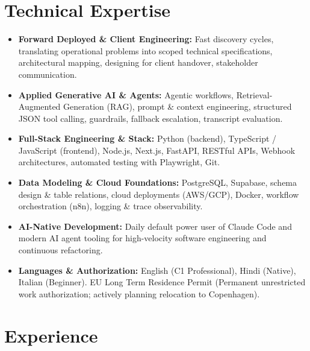 \documentclass[10pt,a4paper]{article}
\begin{document}
\section{Technical Expertise}
\begin{itemize}
  \item \textbf{Forward Deployed \& Client Engineering:} Fast discovery cycles, translating operational problems into scoped technical specifications, architectural mapping, designing for client handover, stakeholder communication.
  \item \textbf{Applied Generative AI \& Agents:} Agentic workflows, Retrieval-Augmented Generation (RAG), prompt \& context engineering, structured JSON tool calling, guardrails, fallback escalation, transcript evaluation.
  \item \textbf{Full-Stack Engineering \& Stack:} Python (backend), TypeScript / JavaScript (frontend), Node.js, Next.js, FastAPI, RESTful APIs, Webhook architectures, automated testing with Playwright, Git.
  \item \textbf{Data Modeling \& Cloud Foundations:} PostgreSQL, Supabase, schema design \& table relations, cloud deployments (AWS/GCP), Docker, workflow orchestration (n8n), logging \& trace observability.
  \item \textbf{AI-Native Development:} Daily default power user of Claude Code and modern AI agent tooling for high-velocity software engineering and continuous refactoring.
  \item \textbf{Languages \& Authorization:} English (C1 Professional), Hindi (Native), Italian (Beginner). EU Long Term Residence Permit (Permanent unrestricted work authorization; actively planning relocation to Copenhagen).
\end{itemize}

\section{Experience}
\end{document}
